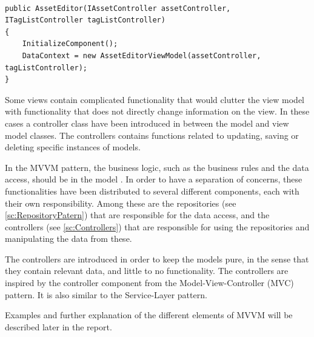 \begin{listing}[H]
\begin{verbatim}

public AssetEditor(IAssetController assetController, ITagListController tagListController)
{
    InitializeComponent();
    DataContext = new AssetEditorViewModel(assetController, tagListController);
}

\end{verbatim}
\label{code:AssetEditorView}
\end{listing}

Some views contain complicated functionality that would clutter the view model with functionality that does not directly change information on the view. In these cases a controller class have been introduced in between the model and view model classes. The controllers contains functions related to updating, saving or deleting specific instances of models. 
\par
In the MVVM pattern, the business logic, such as the business rules and the data access, should be in the model \citep{MvvmBasics}. In order to have a separation of concerns, these functionalities have been distributed to several different components, each with their own responsibility. Among these are the repositories (see \autoref{sc:RepositoryPatern}) that are responsible for the data access, and the controllers (see \autoref{sc:Controllers}) that are responsible for using the repositories and manipulating the data from these.
\par
The controllers are introduced in order to keep the models pure, in the sense that they contain relevant data, and little to no functionality. The controllers are inspired by the controller component from the Model-View-Controller (MVC) pattern. 
It is also similar to the Service-Layer pattern. 
\par
Examples and further explanation of the different elements of MVVM will be described later in the report. 


